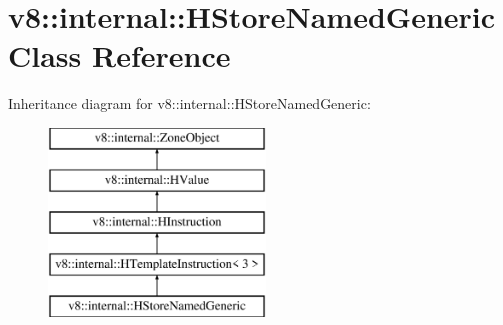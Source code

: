 \hypertarget{classv8_1_1internal_1_1_h_store_named_generic}{}\section{v8\+:\+:internal\+:\+:H\+Store\+Named\+Generic Class Reference}
\label{classv8_1_1internal_1_1_h_store_named_generic}
Inheritance diagram for v8\+:\+:internal\+:\+:H\+Store\+Named\+Generic\+:\begin{figure}[H]
\begin{center}
\leavevmode
\includegraphics[height=5.000000cm]{classv8_1_1internal_1_1_h_store_named_generic}
\end{center}
\end{figure}
